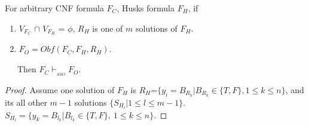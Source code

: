 \documentclass[conference]{IEEEtran}
\begin{document}
For arbitrary CNF formula $F_C$, Husks formula $F_H$, if
\begin{enumerate}
 \item $V_{F_C}$ $\cap$ $V_{F_H}$ = $\phi$, $R_H$ is one of $m$ solutions of $F_H$.
 \item $F_O=Obf(F_C,F_H,R_H)$.
\end{enumerate}
~~~Then $F_C \vdash_{_{SSO}} F_O$.
\begin{proof}

Assume 
        one solution of $F_H$ is $R_H$=$\{y_i=B_{R_k}|B_{R_k} \in \{T,F\}, 1\leqslant k\leqslant n\}$,
        and its all other $m-1$ solutions $\{S_{H_l} | 1\leqslant l\leqslant m-1\}$.
        $S_{H_l}=\{y_k=B_{l_k}|B_{l_k}\in \{ T,F \},~1\leqslant k\leqslant n\}$.   
        

\end{proof}
\end{document}
